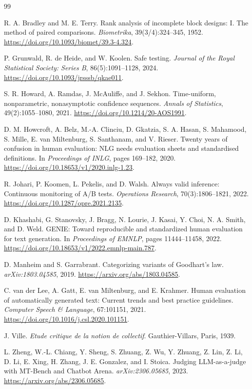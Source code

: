 \documentclass[11pt]{article}
\theoremstyle{remark}
\begin{document}
\footnotesize
\begin{thebibliography}{99}

R. A. Bradley and M. E. Terry.
Rank analysis of incomplete block designs: I. The method of paired comparisons.
\emph{Biometrika}, 39(3/4):324--345, 1952.
\url{https://doi.org/10.1093/biomet/39.3-4.324}.

P. Grunwald, R. de Heide, and W. Koolen.
Safe testing.
\emph{Journal of the Royal Statistical Society: Series B}, 86(5):1091--1128, 2024.
\url{https://doi.org/10.1093/jrsssb/qkae011}.

S. R. Howard, A. Ramdas, J. McAuliffe, and J. Sekhon.
Time-uniform, nonparametric, nonasymptotic confidence sequences.
\emph{Annals of Statistics}, 49(2):1055--1080, 2021.
\url{https://doi.org/10.1214/20-AOS1991}.

D. M. Howcroft, A. Belz, M.-A. Clinciu, D. Gkatzia, S. A. Hasan, S. Mahamood,
S. Mille, E. van Miltenburg, S. Santhanam, and V. Rieser.
Twenty years of confusion in human evaluation: NLG needs evaluation sheets and
standardised definitions.
In \emph{Proceedings of INLG}, pages 169--182, 2020.
\url{https://doi.org/10.18653/v1/2020.inlg-1.23}.

R. Johari, P. Koomen, L. Pekelis, and D. Walsh.
Always valid inference: Continuous monitoring of A/B tests.
\emph{Operations Research}, 70(3):1806--1821, 2022.
\url{https://doi.org/10.1287/opre.2021.2135}.

D. Khashabi, G. Stanovsky, J. Bragg, N. Lourie, J. Kasai, Y. Choi,
N. A. Smith, and D. Weld.
GENIE: Toward reproducible and standardized human evaluation for text generation.
In \emph{Proceedings of EMNLP}, pages 11444--11458, 2022.
\url{https://doi.org/10.18653/v1/2022.emnlp-main.787}.

D. Manheim and S. Garrabrant.
Categorizing variants of Goodhart's law.
\emph{arXiv:1803.04585}, 2019.
\url{https://arxiv.org/abs/1803.04585}.

C. van der Lee, A. Gatt, E. van Miltenburg, and E. Krahmer.
Human evaluation of automatically generated text: Current trends and best practice
guidelines.
\emph{Computer Speech \& Language}, 67:101151, 2021.
\url{https://doi.org/10.1016/j.csl.2020.101151}.

J. Ville.
\emph{Etude critique de la notion de collectif}.
Gauthier-Villars, Paris, 1939.

L. Zheng, W.-L. Chiang, Y. Sheng, S. Zhuang, Z. Wu, Y. Zhuang, Z. Lin,
Z. Li, D. Li, E. Xing, H. Zhang, J. E. Gonzalez, and I. Stoica.
Judging LLM-as-a-judge with MT-Bench and Chatbot Arena.
\emph{arXiv:2306.05685}, 2023.
\url{https://arxiv.org/abs/2306.05685}.

\end{thebibliography}
\normalsize
\end{document}
